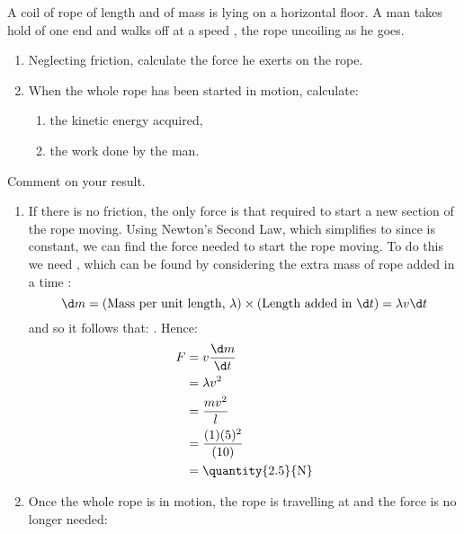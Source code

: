 
\begin{problem} 
{A coil of rope of length  and of mass  is lying on a horizontal floor. A man takes hold of one end and walks off at a speed , the rope uncoiling as he goes.
\begin{enumerate}
	\item Neglecting friction, calculate the force he exerts on the rope.
	\item When the whole rope has been started in motion, calculate:
	\begin{enumerate}
		\item the kinetic energy acquired,
		\item the work done by the man.
	\end{enumerate}
\end{enumerate}
Comment on your result.
}{
}{ %
\begin{enumerate}
	\item If there is no friction, the only force is that required to start a new section of the rope moving. Using Newton's Second Law,  which simplifies to  since  is constant, we can find the force needed to start the rope moving. To do this we need , which can be found by considering the extra mass of rope added in a time :
\begin{equation*} 
\d m = (\text{Mass per unit length, }\lambda)\times(\text{Length added in } \d t) = \lambda v \d t 
\end{equation*}
and so it follows that: .
Hence:
\begin{eqnarray*} 
F &= v\frac{\d m}{\d t} \\ 
&= \lambda v^{2} \\ 
&= \frac{mv^{2}}{l} \\ 
&= \frac{(1)(5)^{2}}{(10)}\\ 
&= \mbox{\quantity{2.5}{N}}
\end{eqnarray*}
\item Once the whole rope is in motion, the rope is travelling at  and the force is no longer needed:

\end{enumerate}}
\end{problem}
